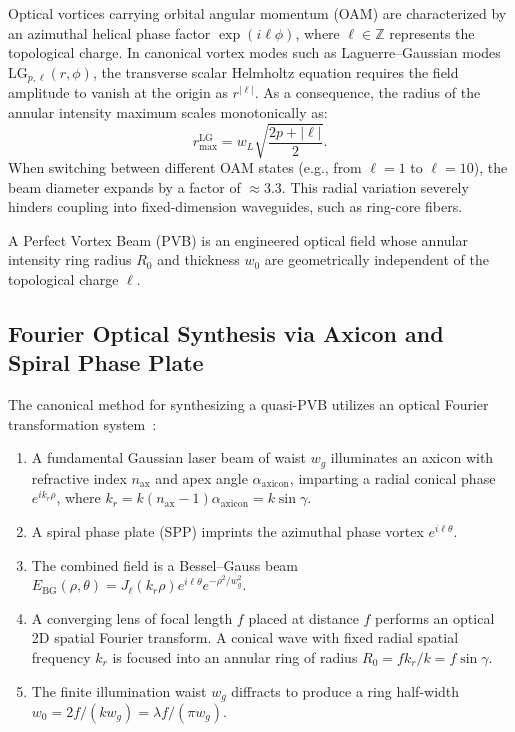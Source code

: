 \documentclass[11pt,a4paper]{article}
\begin{document}
Optical vortices carrying orbital angular momentum (OAM) are characterized by an azimuthal helical phase factor $\exp(i \ell \phi)$, where $\ell \in \mathbb{Z}$ represents the topological charge. In canonical vortex modes such as Laguerre--Gaussian modes $\text{LG}_{p, \ell}(r, \phi)$, the transverse scalar Helmholtz equation requires the field amplitude to vanish at the origin as $r^{|\ell|}$. As a consequence, the radius of the annular intensity maximum scales monotonically as:
\begin{equation}
r_{\max}^{\text{LG}} = w_L \sqrt{\frac{2p + |\ell|}{2}}.
\label{eq:app_lg_scaling}
\end{equation}
When switching between different OAM states (e.g., from $\ell=1$ to $\ell=10$), the beam diameter expands by a factor of $\approx 3.3$. This radial variation severely hinders coupling into fixed-dimension waveguides, such as ring-core fibers.

A Perfect Vortex Beam (PVB) is an engineered optical field whose annular intensity ring radius $R_0$ and thickness $w_0$ are geometrically independent of the topological charge $\ell$.

\subsection{Fourier Optical Synthesis via Axicon and Spiral Phase Plate}

The canonical method for synthesizing a quasi-PVB utilizes an optical Fourier transformation system~\cite{Vaity2015}:
\begin{enumerate}
    \item A fundamental Gaussian laser beam of waist $w_g$ illuminates an axicon with refractive index $n_{\text{ax}}$ and apex angle $\alpha_{\text{axicon}}$, imparting a radial conical phase $e^{i k_r \rho}$, where $k_r = k (n_{\text{ax}}-1) \alpha_{\text{axicon}} = k \sin \gamma$.
    \item A spiral phase plate (SPP) imprints the azimuthal phase vortex $e^{i \ell \theta}$.
    \item The combined field is a Bessel--Gauss beam $E_{\text{BG}}(\rho, \theta) = J_\ell(k_r \rho) e^{i \ell \theta} e^{-\rho^2 / w_g^2}$.
    \item A converging lens of focal length $f$ placed at distance $f$ performs an optical 2D spatial Fourier transform. A conical wave with fixed radial spatial frequency $k_r$ is focused into an annular ring of radius $R_0 = f k_r / k = f \sin \gamma$.
    \item The finite illumination waist $w_g$ diffracts to produce a ring half-width $w_0 = 2f / (k w_g) = \lambda f / (\pi w_g)$.
\end{enumerate}
\end{document}
